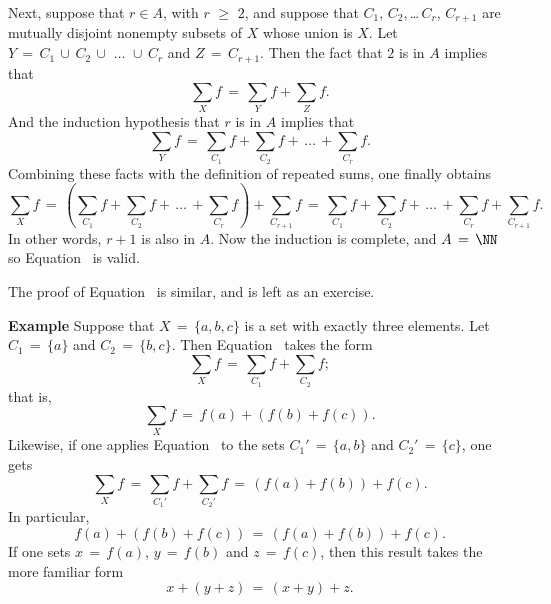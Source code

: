 {        Next, suppose that $r{\in}A$, with $r\,\,{\geq}\,\,2$, and suppose that $C_{1}$, $C_{2}$,\,{\ldots}\,$C_{r}$, $C_{r+1}$ are mutually disjoint nonempty subsets of $X$ whose union is $X$.
    Let $Y \,=\, C_{1}\,{\cup}\,C_{2}\,{\cup}\,\,{\ldots}\,\,{\cup}\,C_{r}$ and $Z \,=\, C_{r+1}$.
    Then the fact that $2$ is in $A$ implies that
        \begin{displaymath}
        {\sum}_{X} f \,=\, {\sum}_{Y} f + {\sum}_{Z} f.
        \end{displaymath}
    And the induction hypothesis that $r$ is in $A$ implies that
        \begin{displaymath}
        {\sum}_{Y} f \,=\, {\sum}_{C_{1}} f + {\sum}_{C_{2}} f + \,{\ldots}\,+ {\sum}_{C_{r}} f.
        \end{displaymath}
    Combining these facts with the definition of repeated sums, one finally obtains
        \begin{displaymath}
        {\sum}_{X} f \,=\, \left({\sum}_{C_{1}} f + {\sum}_{C_{2}} f + \,{\ldots}\,+ {\sum}_{C_{r}} f\right) + {\sum}_{C_{r+1}} f \,=\, 
    {\sum}_{C_{1}} f + {\sum}_{C_{2}} f + \,{\ldots}\,+ {\sum}_{C_{r}} f + {\sum}_{C_{r+1}} f.
        \end{displaymath}
    In other words, $r+1$ is also in $A$. Now the induction is complete, and $A \,=\, {\NN}$ so Equation~ is valid.

        The proof of Equation~ is similar, and is left as an exercise.

\V
\V


        {\bf Example} Suppose that $X \,=\, \{a,b,c\}$ is a set with exactly three elements.
    Let $C_{1} \,=\, \{a\}$ and $C_{2} \,=\, \{b,c\}$.
    Then Equation~ takes the form
        \begin{displaymath}
        {\sum}_{X} f \,=\, {\sum}_{C_{1}} f + {\sum}_{C_{2}} f;
        \end{displaymath}
    that is,
        \begin{displaymath}
        {\sum}_{X} f \,=\, f(a) + (f(b)+f(c)).
        \end{displaymath}
    Likewise, if one applies Equation~ to the sets $C_{1}' \,=\, \{a,b\}$ and $C_{2}' \,=\, \{c\}$, one gets
        \begin{displaymath}
        {\sum}_{X} f \,=\, {\sum}_{C_{1}'} f + {\sum}_{C_{2}'} f \,=\, (f(a)+f(b)) + f(c).
        \end{displaymath}
    In particular,
        \begin{displaymath}
        f(a) + (f(b)+f(c)) \,=\, (f(a)+f(b))+f(c).
        \end{displaymath}
    If one sets $x \,=\, f(a)$, $y \,=\, f(b)$ and $z \,=\, f(c)$, then this  result takes the more familiar form
        \begin{displaymath}
        x+(y+z) \,=\, (x+y)+z.
        \end{displaymath}

}
